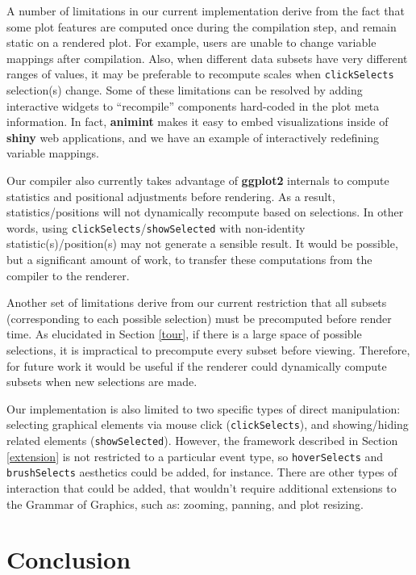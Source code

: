 \documentclass[12pt,]{article}
\theoremstyle{definition}
\theoremstyle{definition}
\theoremstyle{definition}
\theoremstyle{remark}
\begin{document}
A number of limitations in our current implementation derive from the
fact that some plot features are computed once during the compilation
step, and remain static on a rendered plot. For example, users are
unable to change variable mappings after compilation. Also, when
different data subsets have very different ranges of values, it may be
preferable to recompute scales when \texttt{clickSelects} selection(s)
change. Some of these limitations can be resolved by adding interactive
widgets to ``recompile'' components hard-coded in the plot meta
information. In fact, \textbf{animint} makes it easy to embed
visualizations inside of \textbf{shiny} web applications, and we have an
example of interactively redefining variable mappings.

Our compiler also currently takes advantage of \textbf{ggplot2}
internals to compute statistics and positional adjustments before
rendering. As a result, statistics/positions will not dynamically
recompute based on selections. In other words, using
\texttt{clickSelects}/\texttt{showSelected} with non-identity
statistic(s)/position(s) may not generate a sensible result. It would be
possible, but a significant amount of work, to transfer these
computations from the compiler to the renderer.

Another set of limitations derive from our current restriction that all
subsets (corresponding to each possible selection) must be precomputed
before render time. As elucidated in Section \ref{tour}, if there is a
large space of possible selections, it is impractical to precompute
every subset before viewing. Therefore, for future work it would be
useful if the renderer could dynamically compute subsets when new
selections are made.

Our implementation is also limited to two specific types of direct
manipulation: selecting graphical elements via mouse click
(\texttt{clickSelects}), and showing/hiding related elements
(\texttt{showSelected}). However, the framework described in Section
\ref{extension} is not restricted to a particular event type, so
\texttt{hoverSelects} and \texttt{brushSelects} aesthetics could be
added, for instance. There are other types of interaction that could be
added, that wouldn't require additional extensions to the Grammar of
Graphics, such as: zooming, panning, and plot resizing.

\hypertarget{conclusion}{%
\section{Conclusion}\label{conclusion}}
\end{document}
